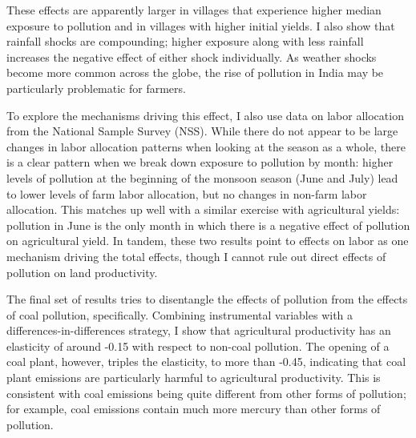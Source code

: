 \documentclass[
]{article}
\begin{document}
These effects are apparently larger in villages that experience higher median exposure to pollution and in villages with higher initial yields. I also show that rainfall shocks are compounding; higher exposure along with less rainfall increases the negative effect of either shock individually. As weather shocks become more common across the globe, the rise of pollution in India may be particularly problematic for farmers.

To explore the mechanisms driving this effect, I also use data on labor allocation from the National Sample Survey (NSS). While there do not appear to be large changes in labor allocation patterns when looking at the season as a whole, there is a clear pattern when we break down exposure to pollution by month: higher levels of pollution at the beginning of the monsoon season (June and July) lead to lower levels of farm labor allocation, but no changes in non-farm labor allocation. This matches up well with a similar exercise with agricultural yields: pollution in June is the only month in which there is a negative effect of pollution on agricultural yield. In tandem, these two results point to effects on labor as one mechanism driving the total effects, though I cannot rule out direct effects of pollution on land productivity.

The final set of results tries to disentangle the effects of pollution from the effects of coal pollution, specifically. Combining instrumental variables with a differences-in-differences strategy, I show that agricultural productivity has an elasticity of around -0.15 with respect to non-coal pollution. The opening of a coal plant, however, triples the elasticity, to more than -0.45, indicating that coal plant emissions are particularly harmful to agricultural productivity. This is consistent with coal emissions being quite different from other forms of pollution; for example, coal emissions contain much more mercury than other forms of pollution.
\end{document}
